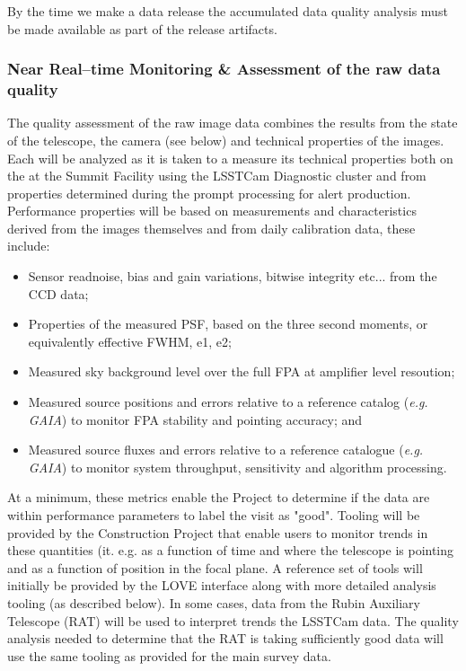 By the time we make a data release the accumulated data quality analysis must be made available as part of the release artifacts.

\subsubsection{Near Real--time Monitoring \& Assessment of the raw data quality} 

The quality assessment of the raw image data combines the results from the state of the telescope, the camera (see below) and technical properties of the images.  Each will be analyzed as it is taken to a measure its technical properties both on the at the Summit Facility using the LSSTCam Diagnostic cluster and from properties determined during the prompt processing for alert production.  Performance properties will be based on measurements and characteristics derived from the images themselves and from daily calibration data, these include:

\begin{itemize}

	\item Sensor readnoise, bias and gain variations, bitwise integrity etc...  from the CCD data;
	\item Properties of the measured PSF, based on the three second moments, or equivalently effective FWHM, e1, e2;
	\item Measured sky background level over the full FPA at amplifier level resoution;
	\item Measured source positions and errors relative to a reference catalog ({\it e.g. GAIA}) to monitor FPA stability and pointing accuracy; and
	\item Measured source fluxes and errors relative to a reference catalogue ({\it e.g. GAIA}) to monitor system throughput, sensitivity and algorithm processing.
	
\end{itemize}

At a minimum, these metrics enable the Project to determine if the data are within performance parameters to label the visit as "good".   Tooling will be provided by the Construction Project that enable users to monitor trends in these quantities ({it. e.g.} as a function of time and where the telescope is pointing and as a function of position in the focal plane.  A reference set of tools will initially be provided by the LOVE interface along with more detailed analysis tooling (as described below).  In some cases, data from the Rubin Auxiliary Telescope (RAT) will be used to interpret trends the LSSTCam data.  The quality analysis needed to determine that the RAT is taking sufficiently good data will use the same tooling as provided for the main survey data.

